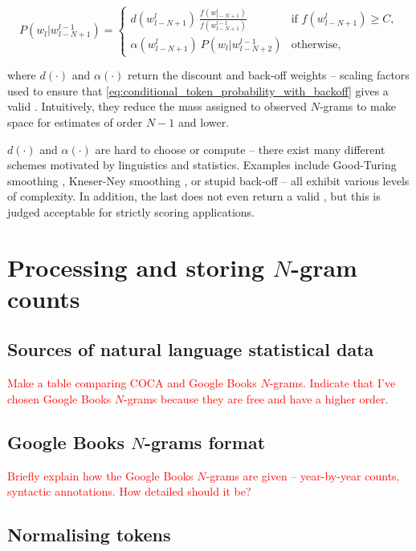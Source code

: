 \documentclass[draft]{IIBproject}
\makeatletter
\DeclareRobustCommand*{\AbbreviationWithDot}[1]{\@ifnextchar{.}{#1}{#1.\@\xspace}}
\DeclareRobustCommand*{\pmf}{\AbbreviationWithDot{p.m.f}}
\DeclareRobustCommand{\noteSelf}[1]{\textcolor{red}{#1}}
\makeatother
\begin{document}
\begin{equation}
	\label{eq:conditional_token_probability_with_backoff}
	P( w_l | w_{l-N+1}^{l-1} ) =
	\begin{cases}
		d (w_{l-N+1}^l) ~ \frac {f\left(w_{l-N+1}^l \right)} {f\left(w_{l-N+1}^{l-1} \right)} & \text{if $f(w_{l-N+1}^l) \ge C$},\\
		\alpha (w_{l-N+1}^l) ~ P( w_l | w_{l-N+2}^{l-1} ) & \text{otherwise},
	\end{cases}
\end{equation}

where $d(\cdot)$ and $\alpha(\cdot)$ return the discount and back-off weights -- scaling factors used to ensure that \cref{eq:conditional_token_probability_with_backoff} gives a valid \pmf. Intuitively, they reduce the mass assigned to observed $N$-grams to make space for estimates of order $N{-}1$ and lower.

$d(\cdot)$ and $\alpha(\cdot)$ are hard to choose or compute -- there exist many different schemes motivated by linguistics and statistics. Examples include Good-Turing smoothing \cite{good1953}, Kneser-Ney smoothing \cite{kneserney1995}, or stupid back-off \cite{brants2007} -- all exhibit various levels of complexity. In addition, the last does not even return a valid \pmf, but this is judged acceptable for strictly scoring applications.

\section{Processing and storing $N$-gram counts}

\subsection{Sources of natural language statistical data}

\noteSelf{Make a table comparing COCA and Google Books $N$-grams. Indicate that I've chosen Google Books $N$-grams because they are free and have a higher order.}

\subsection{Google Books $N$-grams format}

\noteSelf{Briefly explain how the Google Books $N$-grams are given -- year-by-year counts, syntactic annotations. How detailed should it be?}

\subsection{Normalising tokens}
\end{document}
